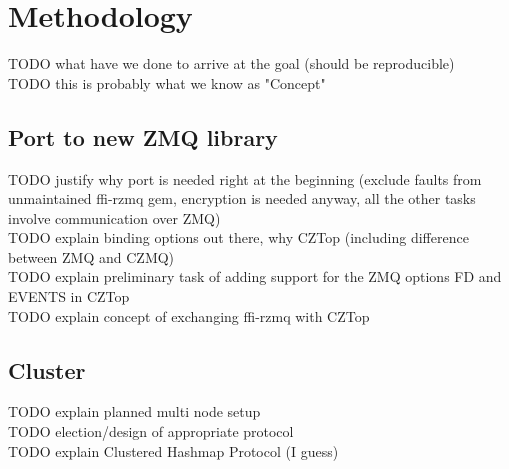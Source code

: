 \chapter{Methodology}
TODO what have we done to arrive at the goal (should be reproducible)\\
TODO this is probably what we know as "Concept"\\



\section{Port to new ZMQ library}\label{sec:meth:port}
TODO justify why port is needed right at the beginning (exclude faults from unmaintained ffi-rzmq gem, encryption is needed anyway, all the other tasks involve communication over ZMQ)\\
TODO explain binding options out there, why CZTop (including difference between ZMQ and CZMQ)\\
TODO explain preliminary task of adding support for the ZMQ options FD and EVENTS in CZTop\\
TODO explain concept of exchanging ffi-rzmq with CZTop\\


\section{Cluster}\label{sec:meth:cluster}
TODO explain planned multi node setup\\
TODO election/design of appropriate protocol\\
TODO explain Clustered Hashmap Protocol (I guess)\\


